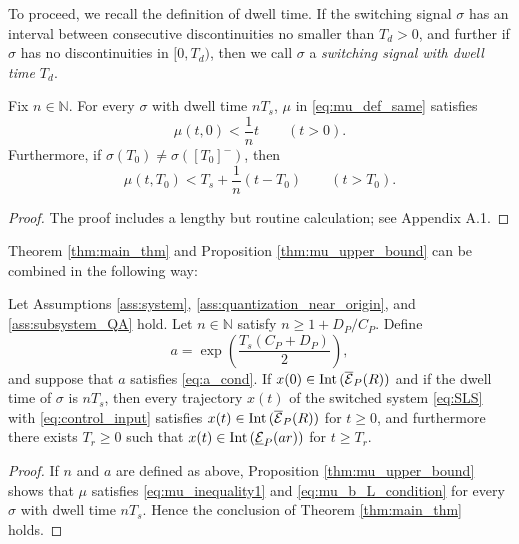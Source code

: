\documentclass[a4, 11pt]{article}
\newcommand{\Int}{\mathop{\rm Int~\!}}
\begin{document}
To proceed, we recall the definition of dwell time.
If the switching signal $\sigma$ has an interval between
consecutive discontinuities no smaller than $T_d > 0$, and further if $\sigma$ 
has no discontinuities in $[0, T_d)$, then we call $\sigma$ 
a \textit{switching signal with dwell time $T_d$}.



\begin{proposition}
\label{thm:mu_upper_bound}
Fix $n \in \mathbb{N}$.
For every $\sigma$ with dwell time $nT_s$, $\mu$ in \eqref{eq:mu_def_same}
satisfies
\begin{equation}
\label{eq:mu_0T} 
\mu(t,0) < \frac{1}{n}t \qquad (t > 0).
\end{equation}
Furthermore, if $\sigma(T_0) \not= \sigma([T_0]^-)$, then 
\begin{equation} 
\label{eq:mu_T0T}
\mu(t,T_0) < T_s + \frac{1}{n}(t-T_0) 
\qquad (t > T_0).
\end{equation}
\end{proposition}

\begin{proof}
The proof includes a lengthy but routine calculation;
see Appendix A.1.
\end{proof}

Theorem \ref{thm:main_thm} and 
Proposition \ref{thm:mu_upper_bound} can be 
combined in the following way:
\begin{theorem}
\label{thm:dwell_sample_switching}
Let Assumptions \ref{ass:system}, \ref{ass:quantization_near_origin}, and
\ref{ass:subsystem_QA} hold.
Let $n \in \mathbb{N}$ satisfy $n \geq 1+D_P/C_P$.
Define 
\begin{equation*}
a = \exp 
\left(
\frac{T_s(C_P + D_P)}{2}
\right),
\end{equation*}
and suppose that $a$ satisfies \eqref{eq:a_cond}.
If $x(0) \in \Int(\overline{\mathcal{E}}_P(R))$
and if the dwell time of $\sigma$ is $nT_s$, then
every trajectory $x(t)$ of the switched system \eqref{eq:SLS} 
with \eqref{eq:control_input} satisfies
$x(t) \in \Int(\overline{\mathcal{E}}_P(R))$ for $t \geq 0$, and furthermore
there exists $T_{r} \geq 0$ such that 
$x(t) \in \Int(\underline{\mathcal{E}}_P(ar))$ for $t \geq T_{r}$.
\end{theorem}
\begin{proof}
If $n$ and $a$ are defined as above, 
Proposition \ref{thm:mu_upper_bound} shows that
$\mu$ satisfies
\eqref{eq:mu_inequality1} and
\eqref{eq:mu_b_L_condition} for every $\sigma$ with dwell time $nT_s$.
Hence the conclusion of Theorem \ref{thm:main_thm} holds.
\end{proof}
\end{document}

